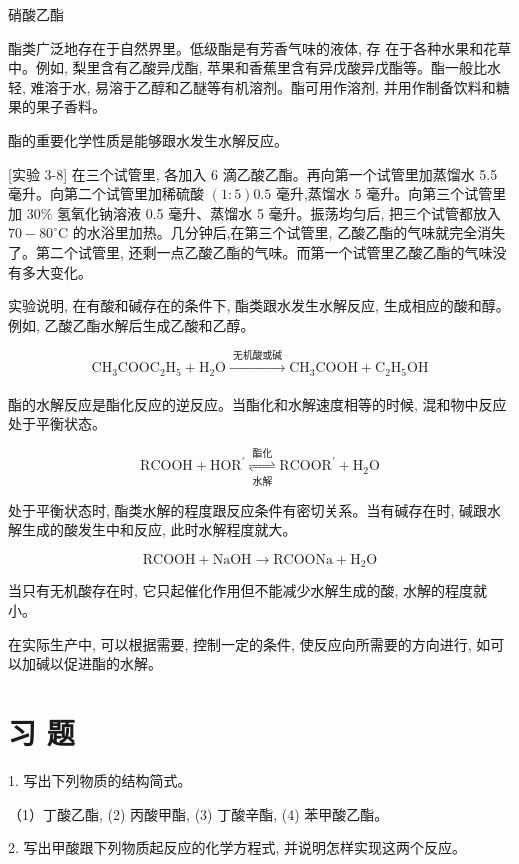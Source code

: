\documentclass[10pt]{article}
\begin{document}
硝酸乙酯

酯类广泛地存在于自然界里。低级酯是有芳香气味的液体, 存 在于各种水果和花草中。例如, 梨里含有乙酸异戊酯, 苹果和香蕉里含有异戊酸异戊酯等。酯一般比水轻, 难溶于水, 易溶于乙醇和乙醚等有机溶剂。酯可用作溶剂, 并用作制备饮料和糖果的果子香料。

酯的重要化学性质是能够跟水发生水解反应。

[实验 3-8] 在三个试管里, 各加入 6 滴乙酸乙酯。再向第一个试管里加蒸馏水 5.5 毫升。向第二个试管里加稀硫酸 \(\left( {1 : 5}\right) {0.5}\) 毫升,蒸馏水 5 毫升。向第三个试管里加 \({30}\%\) 氢氧化钠溶液 0.5 毫升、蒸馏水 5 毫升。振荡均匀后, 把三个试管都放入 \({70} - {80}^{ \circ }\mathrm{C}\) 的水浴里加热。几分钟后,在第三个试管里, 乙酸乙酯的气味就完全消失了。第二个试管里, 还剩一点乙酸乙酯的气味。而第一个试管里乙酸乙酯的气味没有多大变化。

实验说明, 在有酸和碱存在的条件下, 酯类跟水发生水解反应, 生成相应的酸和醇。例如, 乙酸乙酯水解后生成乙酸和乙醇。

\[
{\mathrm{{CH}}}_{3}{\mathrm{{COOC}}}_{2}{\mathrm{H}}_{5} + {\mathrm{H}}_{2}\mathrm{O}\xrightarrow[]{\text{ 无机酸或碱 }}{\mathrm{{CH}}}_{3}\mathrm{{COOH}} + {\mathrm{C}}_{2}{\mathrm{H}}_{5}\mathrm{{OH}}
\]

酯的水解反应是酯化反应的逆反应。当酯化和水解速度相等的时候, 混和物中反应处于平衡状态。

\[
\mathrm{{RCOOH}} + {\mathrm{{HOR}}}^{\prime }\underset{\text{ 水解 }}{\overset{\text{ 酯化 }}{ \rightleftharpoons }}{\mathrm{{RCOOR}}}^{\prime } + {\mathrm{H}}_{2}\mathrm{O}
\]

处于平衡状态时, 酯类水解的程度跟反应条件有密切关系。当有碱存在时, 碱跟水解生成的酸发生中和反应, 此时水解程度就大。

\[
\mathrm{{RCOOH}} + \mathrm{{NaOH}} \rightarrow \mathrm{{RCOONa}} + {\mathrm{H}}_{2}\mathrm{O}
\]

当只有无机酸存在时, 它只起催化作用但不能减少水解生成的酸, 水解的程度就小。

在实际生产中, 可以根据需要, 控制一定的条件, 使反应向所需要的方向进行, 如可以加碱以促进酯的水解。

\section*{习 题}

1. 写出下列物质的结构简式。

（1）丁酸乙酯, (2) 丙酸甲酯, (3) 丁酸辛酯, (4) 苯甲酸乙酯。

2. 写出甲酸跟下列物质起反应的化学方程式, 并说明怎样实现这两个反应。
\end{document}
